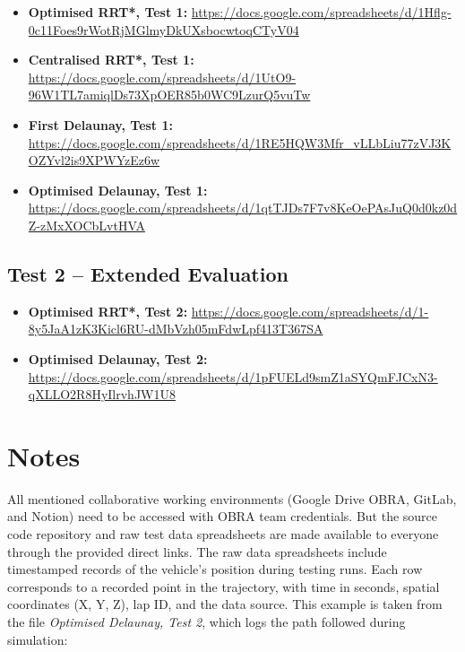 \documentclass[a4paper,11pt]{report}
\begin{document}
\begin{sloppypar}
\begin{itemize}
    \item \textbf{Optimised RRT*, Test 1:} 
    \url{https://docs.google.com/spreadsheets/d/1Hflg-0c11Foes9rWotRjMGlmyDkUXsbocwtoqCTyV04}
    \item \textbf{Centralised RRT*, Test 1:} 
    \url{https://docs.google.com/spreadsheets/d/1UtO9-96W1TL7amiqlDs73XpOER85b0WC9LzurQ5vuTw}
    \item \textbf{First Delaunay, Test 1:} 
    \url{https://docs.google.com/spreadsheets/d/1RE5HQW3Mfr_vLLbLiu77zVJ3KOZYvl2is9XPWYzEz6w}
    \item \textbf{Optimised Delaunay, Test 1:} 
    \url{https://docs.google.com/spreadsheets/d/1qtTJDs7F7v8KeOePAsJuQ0d0kz0dZ-zMxXOCbLvtHVA}
\end{itemize}
\end{sloppypar}

\subsection*{Test 2 – Extended Evaluation}

\begin{sloppypar}
\begin{itemize}
    \item \textbf{Optimised RRT*, Test 2:} \url{https://docs.google.com/spreadsheets/d/1-8y5JaA1zK3Kicl6RU-dMbVzh05mFdwLpf413T367SA}
    \item \textbf{Optimised Delaunay, Test 2:} \url{https://docs.google.com/spreadsheets/d/1pFUELd9smZ1aSYQmFJCxN3-qXLLO2R8HyIlrvhJW1U8}
\end{itemize}
\end{sloppypar}

\vspace{1cm}

\section*{Notes}

All mentioned collaborative working environments (Google Drive OBRA, GitLab, and Notion) need to be accessed with OBRA team credentials.
But the source code repository and raw test data spreadsheets are made available to everyone through the provided direct links.
The raw data spreadsheets include timestamped records of the vehicle's position during testing runs. 
Each row corresponds to a recorded point in the trajectory, with time in seconds, spatial coordinates (X, Y, Z), lap ID, and the data source. 
This example is taken from the file \textit{Optimised Delaunay, Test 2}, which logs the path followed during simulation: 
\end{document}
